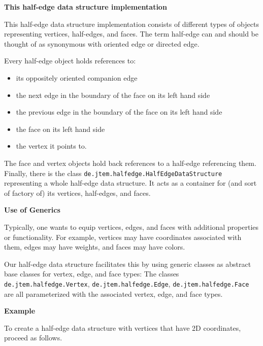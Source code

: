 \documentclass[Thesis.tex]{subfiles}
\begin{document}
{\bf This half-edge data structure implementation}

This half-edge data structure implementation consists of different types of objects representing 
vertices, half-edges, and faces. The term half-edge can and should be thought of as synonymous
with oriented edge or directed edge.

Every half-edge object holds references to:

\begin{itemize}
\item its oppositely oriented companion edge
\item the next edge in the boundary of the face on its left hand side
\item the previous edge in the boundary of the face on its left hand side
\item the face on its left hand side
\item the vertex it points to.
\end{itemize}

The face and vertex objects hold back references to a half-edge referencing them. Finally, there 
is the class {\tt de.jtem.halfedge.HalfEdgeDataStructure} representing a whole half-edge data 
structure. It acts as a container for (and sort of factory of) its vertices, half-edges, and faces.

{\bf Use of Generics}

Typically, one wants to equip vertices, edges, and faces with additional properties or functionality. 
For example, vertices may have coordinates associated with them, edges may have weights, and 
faces may have colors.

Our half-edge data structure facilitates this by using generic classes as abstract base classes for 
vertex, edge, and face types: The classes {\tt de.jtem.halfedge.Vertex}, {\tt de.jtem.halfedge.Edge}, 
{\tt de.jtem.halfedge.Face} are all parameterized with the associated vertex, edge, and face types.

{\bf Example}

To create a half-edge data structure with vertices that have 2D coordinates, proceed as follows.
\end{document}
